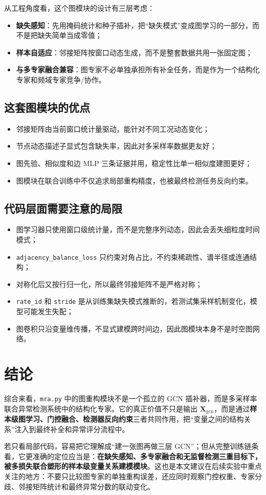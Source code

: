\documentclass[UTF8]{ctexart}
\begin{document}
从工程角度看，这个图模块的设计有三层考虑：
\begin{itemize}
    \item \textbf{缺失感知}：先用掩码统计和种子插补，把“缺失模式”变成图学习的一部分，而不是把缺失简单当成零值；
    \item \textbf{样本自适应}：邻接矩阵按窗口动态生成，而不是整套数据共用一张固定图；
    \item \textbf{与多专家融合兼容}：图专家不必单独承担所有补全任务，而是作为一个结构化专家和频域专家竞争/协作。
\end{itemize}

\subsection{这套图模块的优点}

\begin{itemize}
    \item 邻接矩阵由当前窗口统计量驱动，能针对不同工况动态变化；
    \item 节点动态描述子显式包含缺失率，因此对多采样率数据更友好；
    \item 图先验、相似度和边 MLP 三条证据并用，稳定性比单一相似度建图更好；
    \item 图模块在联合训练中不仅追求局部重构精度，也被最终检测任务反向约束。
\end{itemize}

\subsection{代码层面需要注意的局限}

\begin{itemize}
    \item 图学习器只使用窗口级统计量，而不是完整序列动态，因此会丢失细粒度时间模式；
    \item \verb|adjacency_balance_loss| 只约束对角占比，不约束稀疏性、谱半径或连通结构；
    \item 对称化后又按行归一化，所以最终邻接矩阵不是严格对称；
    \item \verb|rate_id| 和 \verb|stride| 是从训练集缺失模式推断的，若测试集采样机制变化，模型可能发生失配；
    \item 图卷积只沿变量维传播，不显式建模跨时间边，因此图模块本身不是时空图网络。
\end{itemize}

\section{结论}

综合来看，\verb|mra.py| 中的图重构模块不是一个孤立的 GCN 插补器，而是多采样率联合异常检测系统中的结构化专家。它的真正价值不只是输出 \(\bm{X}_{\text{gcn}}\)，而是通过\textbf{样本级图学习、门控融合、检测器反向约束}三者共同作用，把“变量之间的结构关系”注入到最终补全和异常评分流程中。

若只看局部代码，容易把它理解成“建一张图再做三层 GCN”；但从完整训练链条看，它更准确的定位应当是：\textbf{在缺失感知、多专家融合和无监督检测三重目标下，被多损失联合塑形的样本级变量关系建模模块}。这也是本文建议在后续实验中重点关注的地方：不要只比较图专家的单独重构误差，还应同时观察门控权重、专家分歧、邻接矩阵统计和最终异常分数的联动变化。
\end{document}
